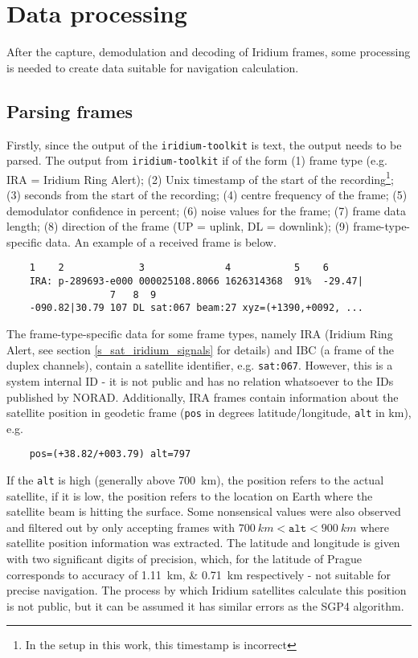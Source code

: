 \section{Data processing}
After the capture, demodulation and decoding of Iridium frames, some processing is needed to create data suitable for navigation calculation.


\subsection{Parsing frames}
Firstly, since the output of the \texttt{iridium-toolkit} is text, the output needs to be parsed. The output from \texttt{iridium-toolkit} if of the form (1) frame type (e.g. IRA = Iridium Ring Alert); (2) Unix timestamp of the start of the recording\footnote{In the setup in this work, this timestamp is incorrect}; (3) seconds from the start of the recording; (4) centre frequency of the frame; (5) demodulator confidence in percent;  (6) noise values for the frame; (7) frame data length; (8) direction of the frame (UP = uplink, DL = downlink); (9) frame-type-specific data. An example of a received frame is below.

\vspace{\parskip}
\noindent\begin{minipage}{\textwidth}
\begin{verbatim}
    1    2             3              4           5    6
    IRA: p-289693-e000 000025108.8066 1626314368  91%  -29.47|
                  7   8  9
    -090.82|30.79 107 DL sat:067 beam:27 xyz=(+1390,+0092, ...
\end{verbatim}
\end{minipage}
\vspace{\parskip}

The frame-type-specific data for some frame types, namely IRA (Iridium Ring Alert, see section \ref{s_sat_iridium_signals} for details) and IBC (a frame of the duplex channels), contain a satellite identifier, e.g. \texttt{sat:067}. However, this is a system internal ID - it is not public and has no relation whatsoever to the IDs published by NORAD. Additionally, IRA frames contain information about the satellite position in geodetic frame (\texttt{pos} in degrees latitude/longitude, \texttt{alt} in km), e.g.

\begin{verbatim}
    pos=(+38.82/+003.79) alt=797
\end{verbatim}

If the \texttt{alt} is high (generally above \qty{700}{km}), the position refers to the actual satellite, if it is low, the position refers to the location on Earth where the satellite beam is hitting the surface. Some nonsensical values were also observed and filtered out by only accepting frames with $\qty{700}{km} < \texttt{alt} < \qty{900}{km}$ where satellite position information was extracted. The latitude and longitude is given with two significant digits of precision, which, for the latitude of Prague corresponds to accuracy of \qtylist{1.11; 0.71}{km} respectively - not suitable for precise navigation. The process by which Iridium satellites calculate this position is not public, but it can be assumed it has similar errors as the SGP4 algorithm.

